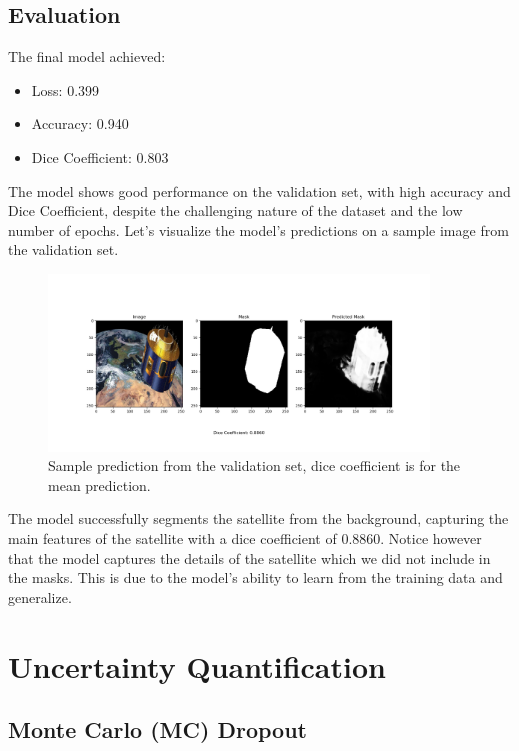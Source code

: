 \documentclass{article}
\begin{document}
\subsection{Evaluation}
The final model achieved:
\begin{itemize}
    \item Loss: 0.399
    \item Accuracy: 0.940
    \item Dice Coefficient: 0.803
\end{itemize}

The model shows good performance on the validation set, with high accuracy and Dice Coefficient, 
despite the challenging nature of the dataset and the low number of epochs. Let's visualize the model's 
predictions on a sample image from the validation set.

\begin{figure}[h]
    \centering
    \includegraphics[width=0.9\textwidth]{../images/output_sample.png}
    \caption{Sample prediction from the validation set, dice coefficient is for the mean prediction.}
    \label{fig:sample_predictions}
\end{figure}

The model successfully segments the satellite from the background, capturing the main features of the satellite
with a dice coefficient of 0.8860. Notice however that the model captures the details of the satellite which we 
did not include in the masks. This is due to the model's ability to learn from the training data and generalize.

\section{Uncertainty Quantification}
\subsection{Monte Carlo (MC) Dropout}
\end{document}
